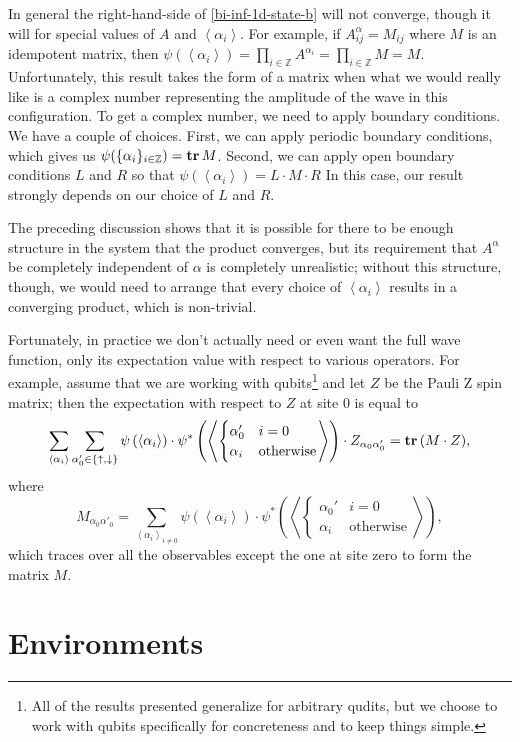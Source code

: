\documentclass{article}
\newcommand{\paren}[1]{\left(#1\right)}
\newcommand{\seq}[1]{\left<#1\right>}
\newcommand{\tr}{\text{\textbf{tr}}\,}
\newcommand{\Z}{\mathbb{Z}}
\begin{document}
In general the right-hand-side of \ref{bi-inf-1d-state-b} will not converge, though it will for special values of $A$ and $\seq{\alpha_i}$.  For example, if $A^\alpha_{ij}=M_{ij}$ where $M$ is an idempotent matrix, then $\psi(\seq{\alpha_i})=\prod_{i\in\Z} A^{\alpha_i} = \prod_{i\in\Z} M = M$.  Unfortunately, this result takes the form of a matrix when what we would really like is a complex number representing the amplitude of the wave in this configuration.  To get a complex number, we need to apply boundary conditions.  We have a couple of choices.  First, we can apply periodic boundary conditions, which gives us $\psi(\{\alpha_i\}_{i\in\Z})=\tr M$.  Second, we can apply open boundary conditions $L$ and $R$ so that $\psi(\seq{\alpha_i})=L\cdot M\cdot R$  In this case, our result strongly depends on our choice of $L$ and $R$.

The preceding discussion shows that it is possible for there to be enough structure in the system that the product converges, but its requirement that $A^\alpha$ be completely independent of $\alpha$ is completely unrealistic;  without this structure, though, we would need to arrange that every choice of $\seq{\alpha_i}$ results in a converging product, which is non-trivial.

Fortunately, in practice we don't actually need or even want the full wave function, only its expectation value with respect to various operators.  For example, assume that we are working with qubits\footnote{All of the results presented generalize for arbitrary qudits, but we choose to work with qubits specifically for concreteness and to keep things simple.} and let $Z$ be the Pauli Z spin matrix;  then the expectation with respect to $Z$ at site 0 is equal to
$$\sum_{\seq{\alpha_i}}\sum_{\alpha'_0\in\{\uparrow,\downarrow\}}\psi\paren{\seq{\alpha_i}}\cdot\psi^*\paren{\seq{\begin{cases}\alpha_0' & i=0 \\ \alpha_i & \text{otherwise}\end{cases}}}\cdot Z_{\alpha_0\alpha'_0}=\tr(M\cdot Z),$$ where $$M_{\alpha_0\alpha'_0}=\sum_{\seq{\alpha_i}_{i\ne 0}}\psi\paren{\seq{\alpha_i}}\cdot\psi^*\paren{\seq{\begin{cases}\alpha_0' & i=0 \\ \alpha_i & \text{otherwise}\end{cases}}},$$
which traces over all the observables except the one at site zero to form the matrix $M$.

\section{Environments}
\end{document}
